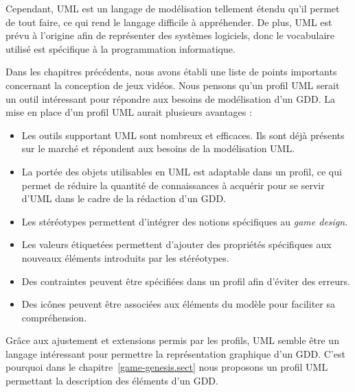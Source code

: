 


Cependant, UML est un langage de modélisation tellement étendu qu'il permet de tout faire, ce qui rend le langage difficile à appréhender.
De plus, UML est prévu à l'origine afin de représenter des systèmes logiciels, donc le vocabulaire utilisé est spécifique à la programmation informatique.


Dans les chapitres précédents, nous avons établi une liste de points importants concernant la conception de jeux vidéos.
Nous pensons qu'un profil UML serait un outil int\'eressant pour répondre aux besoins de modélisation d'un GDD.
La mise en place d'un profil UML aurait plusieurs avantages :
\begin{itemize}
    \item Les outils supportant UML sont nombreux et efficaces. Ils sont déjà présents sur le marché et répondent aux besoins de la modélisation UML.

    \item La port\'ee des objets utilisables en UML est adaptable dans un profil, ce qui permet de réduire la quantité de connaissances à acquérir pour se servir d'UML dans le cadre de la rédaction d'un GDD.

    \item Les stéréotypes permettent d'intégrer des notions spécifiques au \emph{game design}.

    \item Les valeurs \'etiquet\'ees permettent d'ajouter des propriétés spécifiques aux nouveaux éléments introduits par les st\'er\'eotypes.

    \item Des contraintes peuvent être sp\'ecifi\'ees dans un profil afin d'éviter des erreurs.

    \item Des ic\^ones peuvent être associ\'ees aux éléments du modèle pour faciliter sa compréhension.
\end{itemize}



Grâce aux ajustement et extensions permis par les profils, UML semble être un langage int\'eressant pour permettre la représentation graphique d'un GDD.
C'est pourquoi dans le chapitre~\ref{game-genesis.sect} nous proposons un profil UML permettant la description des éléments d'un GDD.
